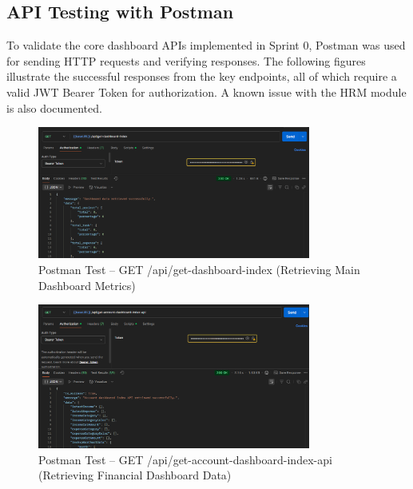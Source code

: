 \subsection{API Testing with Postman}
To validate the core dashboard APIs implemented in Sprint 0, Postman was used for sending HTTP requests and verifying responses. The following figures illustrate the successful responses from the key endpoints, all of which require a valid JWT Bearer Token for authorization. A known issue with the HRM module is also documented.

\begin{figure}[H]
    \centering
    \includegraphics[width=0.8\textwidth]{chapters/chapter 3/hrmFigures/gt-dashboard-index.png}
    \caption{Postman Test -- GET /api/get-dashboard-index (Retrieving Main Dashboard Metrics)}
    \label{fig:postman_main_dashboard}
\end{figure}

\begin{figure}[H]
    \centering
    \includegraphics[width=0.8\textwidth]{chapters/chapter 3/hrmFigures/account-dashboard.png}
    \caption{Postman Test -- GET /api/get-account-dashboard-index-api (Retrieving Financial Dashboard Data)}
    \label{fig:postman_account_dashboard}
\end{figure}

